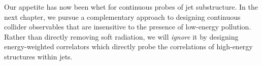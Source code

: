 Our appetite has now been whet for continuous probes of jet substructure.
%
In the next chapter, we pursue a complementary approach to designing continuous collider observables that are insensitive to the presence of low-energy pollution.
%
Rather than directly removing soft radiation, we will \textit{ignore} it by designing energy-weighted correlators which directly probe the correlations of high-energy structures within jets.






